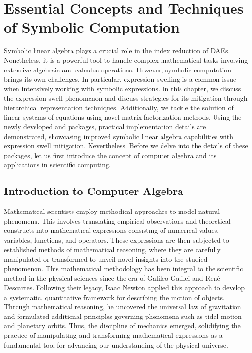 
\chapter{Essential Concepts and Techniques of Symbolic Computation}
\label{chap3:symbolic_computation}

Symbolic linear algebra plays a crucial role in the index reduction of \acp{DAE}. Nonetheless, it is a powerful tool to handle complex mathematical tasks involving extensive algebraic and calculus operations. However, symbolic computation brings its own challenges. In particular, expression swelling is a common issue when intensively working with symbolic expressions. In this chapter, we discuss the expression swell phenomenon and discuss strategies for its mitigation through hierarchical representation techniques. Additionally, we tackle the solution of linear systems of equations using novel matrix factorization methods. Using the newly developed \LEM{} and \LAST{} \Maple{} packages, practical implementation details are demonstrated, showcasing improved symbolic linear algebra capabilities with expression swell mitigation. Nevertheless,  Before we delve into the details of these packages, let us first introduce the concept of computer algebra and its applications in scientific computing.


\section{Introduction to Computer Algebra}
\label{chap2:sec:cas}

Mathematical scientists employ methodical approaches to model natural phenomena. This involves translating empirical observations and theoretical constructs into mathematical expressions consisting of numerical values, variables, functions, and operators. These expressions are then subjected to established methods of mathematical reasoning, where they are carefully manipulated or transformed to unveil novel insights into the studied phenomenon. This mathematical methodology has been integral to the scientific method in the physical sciences since the era of Galileo Galilei and Ren{\'e} Descartes. Following their legacy, Isaac Newton applied this approach to develop a systematic, quantitative framework for describing the motion of objects. Through mathematical reasoning, he uncovered the universal law of gravitation and formulated additional principles governing phenomena such as tidal motion and planetary orbits. Thus, the discipline of mechanics emerged, solidifying the practice of manipulating and transforming mathematical expressions as a fundamental tool for advancing our understanding of the physical universe.

